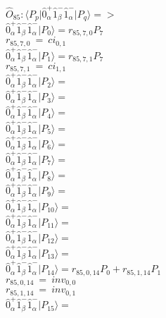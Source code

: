 \documentclass[14pt]{article}
\begin{document}
    $\hat{O}_{85}:  \langle{P_p}\vert \hat{0}_{\alpha}^{+}\hat{1}_{\beta}^{-}\hat{1}_{\alpha}^{-} \vert{P_q}\rangle => $ \\ 
    $ \hat{0}_{\alpha}^{+}\hat{1}_{\beta}^{-}\hat{1}_{\alpha}^{-} \vert{P_{0}}\rangle = {r}_{85,7,0}P_{7} $ \\ 
    ${r}_{85,7,0}\ =\ {ci}_{0,1} $ \\ 
    $ \hat{0}_{\alpha}^{+}\hat{1}_{\beta}^{-}\hat{1}_{\alpha}^{-} \vert{P_{1}}\rangle = {r}_{85,7,1}P_{7} $ \\ 
    ${r}_{85,7,1}\ =\ {ci}_{1,1} $ \\ 
    $ \hat{0}_{\alpha}^{+}\hat{1}_{\beta}^{-}\hat{1}_{\alpha}^{-} \vert{P_{2}}\rangle =  $ \\ 
    $ \hat{0}_{\alpha}^{+}\hat{1}_{\beta}^{-}\hat{1}_{\alpha}^{-} \vert{P_{3}}\rangle =  $ \\ 
    $ \hat{0}_{\alpha}^{+}\hat{1}_{\beta}^{-}\hat{1}_{\alpha}^{-} \vert{P_{4}}\rangle =  $ \\ 
    $ \hat{0}_{\alpha}^{+}\hat{1}_{\beta}^{-}\hat{1}_{\alpha}^{-} \vert{P_{5}}\rangle =  $ \\ 
    $ \hat{0}_{\alpha}^{+}\hat{1}_{\beta}^{-}\hat{1}_{\alpha}^{-} \vert{P_{6}}\rangle =  $ \\ 
    $ \hat{0}_{\alpha}^{+}\hat{1}_{\beta}^{-}\hat{1}_{\alpha}^{-} \vert{P_{7}}\rangle =  $ \\ 
    $ \hat{0}_{\alpha}^{+}\hat{1}_{\beta}^{-}\hat{1}_{\alpha}^{-} \vert{P_{8}}\rangle =  $ \\ 
    $ \hat{0}_{\alpha}^{+}\hat{1}_{\beta}^{-}\hat{1}_{\alpha}^{-} \vert{P_{9}}\rangle =  $ \\ 
    $ \hat{0}_{\alpha}^{+}\hat{1}_{\beta}^{-}\hat{1}_{\alpha}^{-} \vert{P_{10}}\rangle =  $ \\ 
    $ \hat{0}_{\alpha}^{+}\hat{1}_{\beta}^{-}\hat{1}_{\alpha}^{-} \vert{P_{11}}\rangle =  $ \\ 
    $ \hat{0}_{\alpha}^{+}\hat{1}_{\beta}^{-}\hat{1}_{\alpha}^{-} \vert{P_{12}}\rangle =  $ \\ 
    $ \hat{0}_{\alpha}^{+}\hat{1}_{\beta}^{-}\hat{1}_{\alpha}^{-} \vert{P_{13}}\rangle =  $ \\ 
    $ \hat{0}_{\alpha}^{+}\hat{1}_{\beta}^{-}\hat{1}_{\alpha}^{-} \vert{P_{14}}\rangle = {r}_{85,0,14}P_{0}+{r}_{85,1,14}P_{1} $ \\ 
    ${r}_{85,0,14}\ =\ {inv}_{0,0} $ \\ 
    ${r}_{85,1,14}\ =\ {inv}_{0,1} $ \\ 
    $ \hat{0}_{\alpha}^{+}\hat{1}_{\beta}^{-}\hat{1}_{\alpha}^{-} \vert{P_{15}}\rangle =  $ \\ 
    
\end{document}
